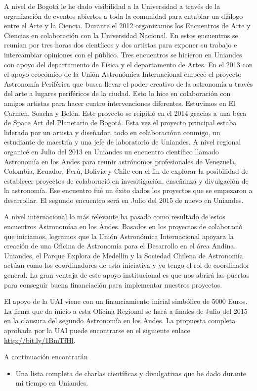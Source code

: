 \documentclass[letterpaper,12pt,onecolumn]{article}
\begin{document}
A nivel de Bogot\'a le he dado visibilidad a la Universidad a trav\'es de
la organizaci\'on de eventos abiertos a toda la comunidad para
entablar un di\'alogo entre el Arte y la Ciencia. Durante el 2012
organizamos los Encuentros de Arte y Ciencias en colaboraci\'on con la
Universidad Nacional. En estos encuentros se reun\'ian por tres horas
dos cient\'iicos y dos artistas para exponer su trabajo e intercambiar
opiniones con el p\'ublico. Tres encuentros se hicieron en Uniandes
con apoyo del departamento de F\'isica y el departamento de Artes. 
En el 2013 con el apoyo ecoc\'omico de la Uni\'on Astron\'omica
Internacional empec\'e el proyecto Astronom\'ia Perif\'erica que busca
llevar el poder creativo de la astronom\'ia a trav\'es del arte a lugares
perif\'ericos de la ciudad. Esto lo hice en colaboraci\'on con amigos
artistas para hacer cuatro intervenciones diferentes. Estuvimos en El
Carmen, Soacha y Bel\'en. Este proyecto se reipiti\'o en el 2014 gracias a
una beca de Space Art del Planetario de Bogot\'a. Esta vez el proyecto
principal estaba liderado por un artista y dise\~nador, todo en
colaboraci\'onn conmigo,  un estudiante de maestr\'ia y una jefe de
laboratorio de Uniandes.
A nivel regional organic\'e  en Julio del 2013 en Uniandes un encuentro
cient\'ifico llamado Astronom\'ia en los Andes para reunir astr\'onomos
profesionales de Venezuela, Colombia, Ecuador, Per\'u, Bolivia y Chile
con el fin de explorar la posibilidad de establecer proyectos de
colaboraci\'o  en invesitigaci\'on, ense\~nanza y divulgaci\'on de la
astronom\'ia. Ese encuentro fu\'e un \'exito dados los proyectos que
se empezaron a desarrollar. El segundo encuentro ser\'a en Julio del
2015 de nuevo en Uniandes. 

A nivel internacional lo m\'as relevante ha pasado como resultado de estos
encuentros Astronom\'iaa en los Andes. Basados en los proyectos de
colaboraci\'o  que iniciamos, logramos que la Uni\'on Astron\'omica
Internacional apoyara la creaci\'on de una Oficina de Astronom\'ia
para el Desarrollo en el \'area Andina. Uniandes, el Parque Explora de
Medell\'in y la Sociedad Chilena de Astronom\'ia act\'uan como los
coordinadores de esta iniciativa y yo tengo el rol de coordinador
general. La gran ventaja de este apoyo institucional es que nos
abrir\'a las puertas para conseguir buena financiaci\'on para
implementar nuestros proyectos. 

El apoyo de la UAI viene con un financiamiento inicial simb\'olico de
5000 Euros. La firma que da inicio a esta Oficina Regional se har\'a a
finales de Julio del 2015 en la clausura del segundo Astronom\'ia en los Andes. 
La propuesta completa aprobada por la UAI puede encontrarse en el siguiente enlace \url{http://bit.ly/1BmTfHl}.
  
A continuaci\'on encontrar\'an 
\begin{itemize}
\item  Una lista completa de charlas cient\'ificas y divulgativas que
  he dado durante mi tiempo en Uniandes. 
\end{itemize}
\end{document}
